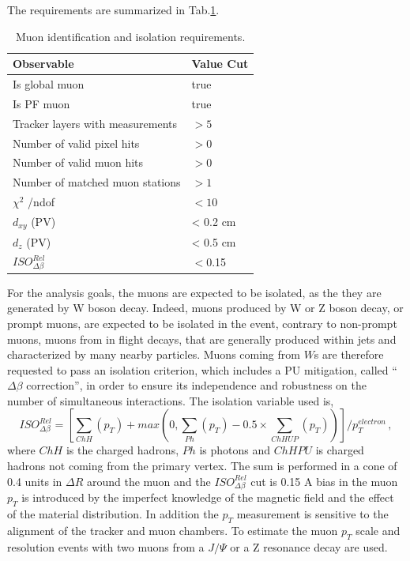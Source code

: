 The requirements are summarized in Tab.\ref{IDm}.
\begin{table}
\centering
\begin{tabular}{|ll|}
\hline
Observable& Value Cut\\
\hline
Is global muon                        & true              \\ 
Is PF muon                            & true              \\ 
Tracker layers with measurements      & $>5$              \\ 
Number of valid pixel hits            & $>0$              \\ 
Number of valid muon hits             & $>0$              \\ 
Number of matched muon stations       & $>1$              \\ 
$\chi^2$ /ndof                        & $<10$             \\ 
$d_{xy}$ (PV)                         & < 0.2 cm          \\ 
$d_z$ (PV)                            & < 0.5 cm          \\ 
\hline
$ISO^{Rel}_{\Delta \beta}$              & $<$0.15\\
\hline
\end{tabular}
\caption{Muon identification and isolation requirements.}
\label{IDm}
\end{table}
For the analysis goals, the muons are expected to be isolated, as the they are generated by W boson decay. 
Indeed, muons produced by W or Z boson decay, or prompt muons, are expected to be isolated in the event, contrary to non-prompt muons, muons from in flight decays, that are generally produced within jets and characterized by many
nearby particles. Muons coming from $W$s are therefore requested to pass an isolation
criterion, which includes a PU mitigation, called ``$\Delta \beta$ correction'',
in order to ensure its independence and robustness on
the number of simultaneous interactions. The isolation variable used is,
\begin{equation} 
ISO^{Rel}_{\Delta \beta}=[\sum_{ChH}(p_T) + max(0, \sum_{Ph}(p_T) -0.5 \times \sum_{ChHUP}(p_T)) ]/p_T^{electron} \, ,
\end{equation}
where $ChH$ is the charged hadrons, $Ph$ is photons and $ChHPU$ is charged
hadrons not coming from the primary vertex.  The sum is performed in a cone of 0.4 units in $\Delta R$ around the muon
and the $ISO^{Rel}_{\Delta \beta}$ cut is 0.15
A bias in the muon $p_T$ is introduced by the imperfect knowledge
of the magnetic field and the effect of the material distribution. In addition the $p_T$ measurement is sensitive to the alignment of the tracker and
muon chambers. To estimate the muon $p_T$ scale and resolution 
events with two muons from a $J/\Psi$ or a Z
resonance decay are used. 

